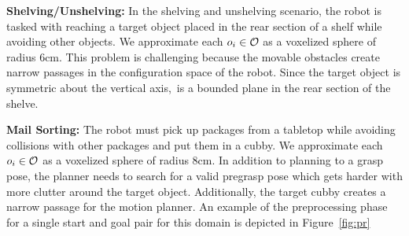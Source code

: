 \documentclass[a4paper]{report}
\begin{document}
\textbf{Shelving/Unshelving:}
In the shelving and unshelving scenario, the robot is tasked with reaching a target object placed in the rear section of a shelf while avoiding other objects. %
 We approximate each $o_i \in \mathcal{O}$ as a voxelized sphere of radius 6cm.
 This problem is challenging because the movable obstacles create narrow passages in the configuration space of the robot.
 Since the target object is symmetric about the vertical axis,~\calG is a bounded plane in the rear section of the shelve.
 
\textbf{Mail Sorting:}
The robot must pick up packages from a tabletop while avoiding collisions with other packages and put them in a cubby. We approximate each $o_i \in \mathcal{O}$ as a voxelized sphere of radius 8cm. %
In addition to planning to a grasp pose, the planner needs to search for a valid pregrasp pose which gets harder with more clutter around the target object. Additionally, the target cubby creates a narrow passage for the motion planner.
%
An example of the preprocessing phase for a single start and goal pair for this domain is depicted in Figure~\ref{fig:pr} 
\end{document}
